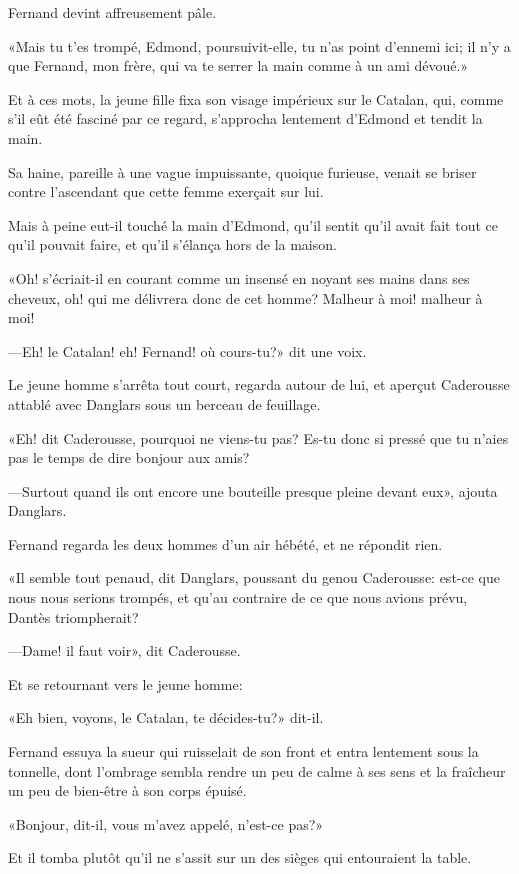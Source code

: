 Fernand devint affreusement pâle.

«Mais tu t'es trompé, Edmond, poursuivit-elle, tu n'as point d'ennemi ici; il n'y a que Fernand, mon frère, qui va te serrer la main comme à un ami dévoué.»

Et à ces mots, la jeune fille fixa son visage impérieux sur le Catalan, qui, comme s'il eût été fasciné par ce regard, s'approcha lentement d'Edmond et tendit la main.

Sa haine, pareille à une vague impuissante, quoique furieuse, venait se briser contre l'ascendant que cette femme exerçait sur lui.

Mais à peine eut-il touché la main d'Edmond, qu'il sentit qu'il avait fait tout ce qu'il pouvait faire, et qu'il s'élança hors de la maison.

«Oh! s'écriait-il en courant comme un insensé en noyant ses mains dans ses cheveux, oh! qui me délivrera donc de cet homme? Malheur à moi! malheur à moi!

—Eh! le Catalan! eh! Fernand! où cours-tu?» dit une voix.

Le jeune homme s'arrêta tout court, regarda autour de lui, et aperçut Caderousse attablé avec Danglars sous un berceau de feuillage.

«Eh! dit Caderousse, pourquoi ne viens-tu pas? Es-tu donc si pressé que tu n'aies pas le temps de dire bonjour aux amis?

—Surtout quand ils ont encore une bouteille presque pleine devant eux», ajouta Danglars.

Fernand regarda les deux hommes d'un air hébété, et ne répondit rien.

«Il semble tout penaud, dit Danglars, poussant du genou Caderousse: est-ce que nous nous serions trompés, et qu'au contraire de ce que nous avions prévu, Dantès triompherait?

—Dame! il faut voir», dit Caderousse.

Et se retournant vers le jeune homme:

«Eh bien, voyons, le Catalan, te décides-tu?» dit-il.

Fernand essuya la sueur qui ruisselait de son front et entra lentement sous la tonnelle, dont l'ombrage sembla rendre un peu de calme à ses sens et la fraîcheur un peu de bien-être à son corps épuisé.

«Bonjour, dit-il, vous m'avez appelé, n'est-ce pas?»

Et il tomba plutôt qu'il ne s'assit sur un des sièges qui entouraient la table.

